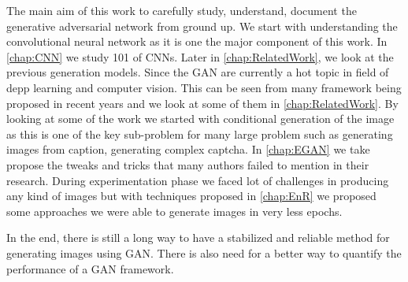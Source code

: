\doublespacing
{}
\label{chap:Conclusion}

The main aim of this work to carefully study, understand, document the generative adversarial network from ground up. We start with understanding the  convolutional neural network as it is one the major component of this work. In \autoref{chap:CNN} we study 101 of CNNs. Later in \autoref{chap:RelatedWork}, we look at the previous generation models. Since the GAN are currently a hot topic in field of depp learning and computer vision. This can be seen from many framework being proposed in recent years and we look at some of them in \autoref{chap:RelatedWork}. By looking at some of the work we started with conditional generation of the image as this is one of the key sub-problem for many large problem such as generating images from caption, generating complex captcha. In \autoref{chap:EGAN} we take propose the  tweaks and tricks that many authors failed to mention in their research. During experimentation phase we faced lot of challenges in producing any kind of images but with techniques proposed in \autoref{chap:EnR} we proposed some approaches we were able to generate images in very less epochs.
\par
In the end, there is still a long way to have a stabilized and reliable method for generating images using GAN. There is also need for a better way to quantify the  performance of a GAN framework.